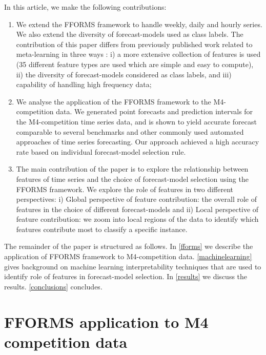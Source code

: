 \documentclass[11pt,a4paper,]{article}
\providecommand{\tightlist}{%
  \setlength{\itemsep}{0pt}\setlength{\parskip}{0pt}}
\begin{document}
In this article, we make the following contributions:

\begin{enumerate}
\def\labelenumi{\arabic{enumi}.}
\tightlist
\item
  We extend the FFORMS framework to handle weekly, daily and hourly
  series. We also extend the diversity of forecast-models used as class
  labels. The contribution of this paper differs from previously
  published work related to meta-learning
  \autocites{prudencio2004meta}{lemke2010meta}{kuck2016meta} in three
  ways : i) a more extensive collection of features is used (35
  different feature types are used which are simple and easy to
  compute), ii) the diversity of forecast-models considered as class
  labels, and iii) capability of handling high frequency data;
\item
  We analyse the application of the FFORMS framework to the
  M4-competition data. We generated point forecasts and prediction
  intervals for the M4-competition time series data, and is shown to
  yield accurate forecast comparable to several benchmarks and other
  commonly used automated approaches of time series forecasting. Our
  approach achieved a high accuracy rate based on individual
  forecast-model selection rule.
\item
  The main contribution of the paper is to explore the relationship
  between features of time series and the choice of forecast-model
  selection using the FFORMS framework. We explore the role of features
  in two different perspectives: i) Global perspective of feature
  contribution: the overall role of features in the choice of different
  forecast-models and ii) Local perspective of feature contribution: we
  zoom into local regions of the data to identify which features
  contribute most to classify a specific instance.
\end{enumerate}

The remainder of the paper is structured as follows. In \autoref{fforms}
we describe the application of FFORMS framework to M4-competition data.
\autoref{machinelearning} gives background on machine learning
interpretability techniques that are used to identify role of features
in forecast-model selection. In \autoref{results} we discuss the
results. \autoref{conclusions} concludes.

\section{FFORMS application to M4 competition data}\label{fforms}
\end{document}
